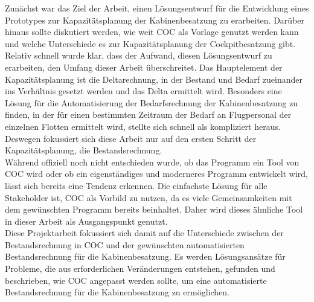 \documentclass [12pt, a4paper, oneside, titlepage, ngerman]{article}
\begin{document}

Zunächst war das Ziel der Arbeit, einen Lösungsentwurf für die Entwicklung eines Prototypes zur Kapazitätsplanung der Kabinenbesatzung zu erarbeiten. Darüber hinaus sollte diskutiert werden, wie weit \ac{COC} als Vorlage genutzt werden kann und welche Unterschiede es zur Kapazitätsplanung der Cockpitbesatzung gibt. \\
Relativ schnell wurde klar, dass der Aufwand, diesen Lösungsentwurf zu erarbeiten, den Umfang dieser Arbeit überschreitet. Das Hauptelement der Kapazitätsplanung ist die Deltarechnung, in der Bestand und Bedarf zueinander ins Verhältnis gesetzt werden und das Delta ermittelt wird. Besonders eine Lösung für die Automatisierung der Bedarfsrechnung der Kabinenbesatzung zu finden, in der für einen bestimmten Zeitraum der Bedarf an Flugpersonal der einzelnen Flotten ermittelt wird, stellte sich schnell als kompliziert heraus. Deswegen fokussiert sich diese Arbeit nur auf den ersten Schritt der Kapazitätsplanung, die Bestandsrechnung. \\
Während offiziell noch nicht entschieden wurde, ob das Programm ein Tool von \ac{COC} wird oder ob ein eigenständiges und moderneres Programm entwickelt wird, lässt sich bereits eine Tendenz erkennen. Die einfachste Lösung für alle Stakeholder ist, \ac{COC} als Vorbild zu nutzen, da es viele Gemeinsamkeiten mit dem gewünschten Programm bereits beinhaltet. Daher wird dieses ähnliche Tool in dieser Arbeit als Ausgangspunkt genutzt. \\
Diese Projektarbeit fokussiert sich damit auf die Unterschiede zwischen der Bestandsrechnung in \ac{COC} und der gewünschten automatisierten Bestandsrechnung für die Kabinenbesatzung. Es werden Lösungsansätze für Probleme, die aus erforderlichen Veränderungen entstehen, gefunden und beschrieben, wie \ac{COC} angepasst werden sollte, um eine automatisierte Bestandsrechnung für die Kabinenbesatzung zu ermöglichen.
\end{document}
